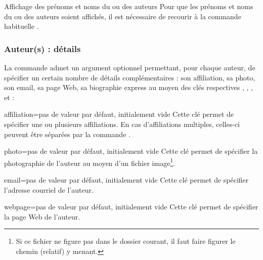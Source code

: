 \begin{dbremark}{Affichage des prénoms et noms du ou des auteurs}{}
  Pour que les prénoms et noms du ou des auteurs soient affichés, il est
  nécessaire de recourir à la commande habituelle .
\end{dbremark}

\subsubsection{Auteur(s) : détails}
\label{sec-auteurs-details}

La commande  admet un argument optionnel permettant, pour chaque
auteur, de spécifier un certain nombre de détails complémentaires : son affiliation, sa
photo, son email, sa page Web, sa biographie express au moyen des clés
respectives %
, , ,  et
 :
\begin{bodycode}
\author[%
  affiliation=+\marg{affiliation(s)}+,%
  photo=+\meta{photo}+,%
  email=+\meta{email}+,%
  webpage=+\meta{page Web}+,%
  minibio=+\marg{biographie express}+%
]{++, ++}
\end{bodycode}

\begin{docKey}{affiliation}{={}}{pas de valeur par défaut,
    initialement vide}
  Cette clé permet de spécifier une ou plusieurs affiliations. En cas
  d'affiliations multiples, celles-ci peuvent être séparées par la commande
  .
\end{docKey}

\begin{docKey}{photo}{={}}{pas de valeur par défaut,
    initialement vide}
  Cette clé permet de spécifier la photographie de l'auteur au moyen d'un
  fichier image\footnote{Si ce fichier ne figure pas dans le dossier courant, il
    faut faire figurer le chemin (relatif) y menant.}. %
\end{docKey}

\begin{docKey}{email}{={}}{pas de valeur par défaut,
    initialement vide}
  Cette clé permet de spécifier l'adresse courriel de l'auteur.
\end{docKey}

\begin{docKey}{webpage}{={}}{pas de valeur par défaut,
    initialement vide}
  Cette clé permet de spécifier la page Web de l'auteur.
\end{docKey}

